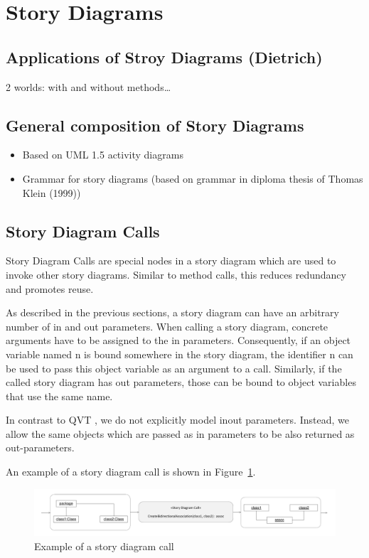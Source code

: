 \section{Story Diagrams} \label{sec:StoryDiagrams}

\subsection{Applications of Stroy Diagrams (Dietrich)}
2 worlds: with and without methods\ldots

\subsection{General composition of Story Diagrams}
\begin{itemize}
  \item Based on UML 1.5 activity diagrams
  \item Grammar for story diagrams (based on grammar in diploma thesis of Thomas Klein (1999))
\end{itemize}

\subsection{Story Diagram Calls}

Story Diagram Calls are special nodes in a story diagram which are used to invoke other story diagrams. Similar to method calls, this reduces redundancy and promotes reuse.

As described in the previous sections, a story diagram can have an arbitrary number of in and out parameters. When calling a story diagram, concrete arguments have to be assigned to the in parameters. Consequently, if an object variable named n is bound somewhere in the story diagram, the identifier n can be used to pass this object variable as an argument to a call. Similarly, if the called story diagram has out parameters, those can be bound to object variables that use the same name.

In contrast to QVT \cite{QVT}, we do not explicitly model inout parameters. Instead, we allow the same objects which are passed as in parameters to be also returned as out-parameters.

An example of a story diagram call is shown in Figure~\ref{fig:call}.

\begin{figure}[htb]
\begin{center}
  \includegraphics[width=\textwidth]{figures/StoryDiagramCall}
  \caption{Example of a story diagram call}
  \label{fig:call}
\end{center}
\end{figure}

